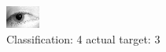 \begin{figure}[h!]
\begin{center}
\includegraphics[width=0.60\columnwidth]{figures/ID1293_class_4_target_3.png}
\end{center}
\caption{ Classification: 4 actual target: 3}
\label{fig:ID1293_class_4_target_3}
\end{figure}
